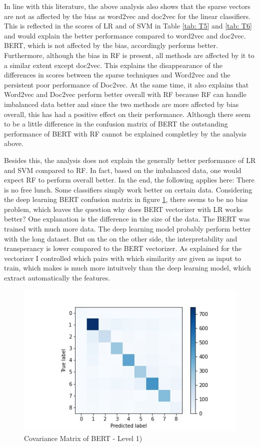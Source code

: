 \documentclass[12pt, a4paper, titlepage]{article}
\begin{document}
In line with this literature, the above analysis also shows that the sparse vectors are not as affected by the bias as word2vec and doc2vec for the linear classifiers. This is reflected in the scores of LR and of SVM in Table \ref{tab: T5} and \ref{tab: T6} and would explain the better performance compared to word2vec and doc2vec. BERT, which is not affected by the bias, accordingly performs better. Furthermore, although the bias in RF is present, all methods are affected by it to a similar extent except doc2vec. This explains the disappearance of the differences in scores between the sparse techniques and Word2vec and the persistent poor performance of Doc2vec. At the same time, it also explains that Word2vec and Doc2vec perform better overall with RF because RF can handle imbalanced data better and since the two methods are more affected by bias overall, this has had a positive effect on their performance. Although there seem to be a little difference in the confusion matrix of \ac{BERT} the outstanding performance of \ac{BERT} with \ac{RF} cannot be explained completley by the analysis above. 

Besides this, the analysis does not explain the generally better performance of LR and SVM compared to RF. In fact, based on the imbalanced data, one would expect RF to perform overall better. In the end, the following applies here: There is no free lunch. Some classifiers simply work better on certain data. Considering the deep learning \ac{BERT} confusion matrix in figure \ref{fig: F25}, there seems to be no bias problem, which leaves the question why does \ac{BERT} vectorizer with \ac{LR} works better? One explanation is the difference in the size of the data. The \ac{BERT} was trained with much more data. The deep learning model probably perform better with the long dataset. But on the on the other side, the interpretability and transperancy is lower compared to the \ac{BERT} vectorizer. As explained for the vectorizer I controlled which pairs with which similarity are given as input to train, which makes is much more intuitvely than the deep learning model, which extract automatically the features. 

\begin{figure}[hb!]
  \center
  \includegraphics[scale=0.5]{cm_bert_clf_l1.jpg}
  \caption{\label{fig: F25} Covariance Matrix of \ac{BERT} - Level 1)}
\end{figure}
\end{document}
